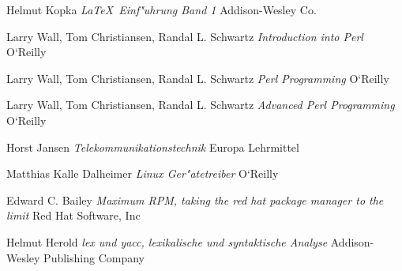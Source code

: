  Helmut Kopka
 \textsl{ \LaTeX\ Einf"uhrung Band 1 }
 Addison-Wesley Co.

 Larry Wall, Tom Christiansen, Randal L. Schwartz
 \textsl{ Introduction into Perl }
 O`Reilly

 Larry Wall, Tom Christiansen, Randal L. Schwartz
 \textsl{ Perl Programming }
 O`Reilly

 Larry Wall, Tom Christiansen, Randal L. Schwartz
 \textsl{ Advanced Perl Programming }
 O`Reilly

 Horst Jansen 
 \textsl{ Telekommunikationstechnik }
 Europa Lehrmittel

 Matthias Kalle Dalheimer
 \textsl{ Linux Ger"atetreiber }
 O`Reilly

 Edward C. Bailey
 \textsl{ Maximum RPM, taking the red hat package manager to the limit }
 Red Hat Software, Inc

 Helmut Herold
 \textsl{ lex und yacc, lexikalische und syntaktische Analyse }
 Addison-Wesley Publishing Company


